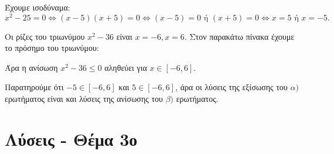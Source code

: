 
\begin{alist}
\item Έχουμε ισοδύναμα:
\[x^2 - 25 = 0 \Leftrightarrow (x - 5)(x + 5) = 0 \Leftrightarrow (x - 5) = 0 \text{ ή } (x + 5) = 0 \Leftrightarrow x = 5 \text{ ή } x = -5.\]

\item Οι ρίζες του τριωνύμου $x^2 - 36$ είναι $x = -6, x = 6$. Στον παρακάτω πίνακα έχουμε το πρόσημο του τριωνύμου:

\begin{center}
\end{center}

Άρα η ανίσωση $x^2 - 36 \le 0$ αληθεύει για $x \in [-6, 6]$.

\item Παρατηρούμε ότι $-5 \in [-6, 6]$ και $5 \in [-6, 6]$, άρα οι λύσεις της εξίσωσης του $\alpha)$ ερωτήματος είναι και λύσεις της ανίσωσης του $\beta)$ ερωτήματος.
\end{alist}



\newpage
\section{Λύσεις - Θέμα 3ο}

